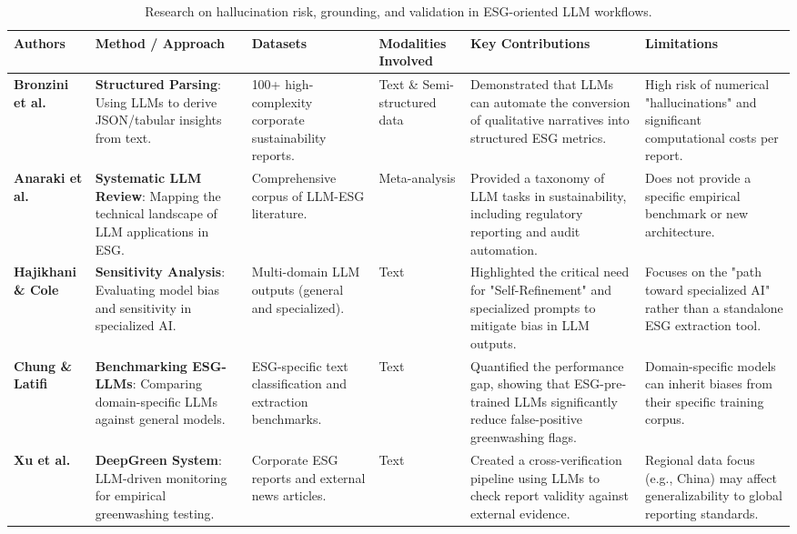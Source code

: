 \begin{landscape}
\begin{table}[p]
\centering
\caption{Research on hallucination risk, grounding, and validation in ESG-oriented LLM workflows.}
\label{tab:relatedwork-hallucination-grounding-a}
\small
\renewcommand{\arraystretch}{1.2}
\begin{tabularx}{\linewidth}{|p{1.8cm}|p{3.5cm}|p{3.5cm}|p{1.8cm}|X|X|}
\hline
Authors & Method / Approach & Datasets & Modalities Involved & Key Contributions & Limitations \\ \hline
\textbf{Bronzini et al.}  \parencite{marco_bronzini_bf94d949} & \textbf{Structured Parsing}: Using LLMs to derive JSON/tabular insights from text. & 100+ high-complexity corporate sustainability reports. & Text \& Semi-structured data & Demonstrated that LLMs can automate the conversion of qualitative narratives into structured ESG metrics. & High risk of numerical "hallucinations" and significant computational costs per report. \\ \hline
\textbf{Anaraki et al.}  \parencite{seyed_alireza_mousavian_anaraki_b56a1c0f} & \textbf{Systematic LLM Review}: Mapping the technical landscape of LLM applications in ESG. & Comprehensive corpus of LLM-ESG literature. & Meta-analysis & Provided a taxonomy of LLM tasks in sustainability, including regulatory reporting and audit automation. & Does not provide a specific empirical benchmark or new architecture. \\ \hline
\textbf{Hajikhani \& Cole}  \parencite{arash_hajikhani_cbb2528f} & \textbf{Sensitivity Analysis}: Evaluating model bias and sensitivity in specialized AI. & Multi-domain LLM outputs (general and specialized). & Text & Highlighted the critical need for "Self-Refinement" and specialized prompts to mitigate bias in LLM outputs. & Focuses on the "path toward specialized AI" rather than a standalone ESG extraction tool. \\ \hline
\textbf{Chung \& Latifi}  \parencite{tae_sun_chung_e16a4c18} & \textbf{Benchmarking ESG-LLMs}: Comparing domain-specific LLMs against general models. & ESG-specific text classification and extraction benchmarks. & Text & Quantified the performance gap, showing that ESG-pre-trained LLMs significantly reduce false-positive greenwashing flags. & Domain-specific models can inherit biases from their specific training corpus. \\ \hline
\textbf{Xu et al.}  \parencite{chong_xu_bff21576} & \textbf{DeepGreen System}: LLM-driven monitoring for empirical greenwashing testing. & Corporate ESG reports and external news articles. & Text & Created a cross-verification pipeline using LLMs to check report validity against external evidence. & Regional data focus (e.g., China) may affect generalizability to global reporting standards. \\ \hline

\end{tabularx}
\end{table}
\end{landscape}
